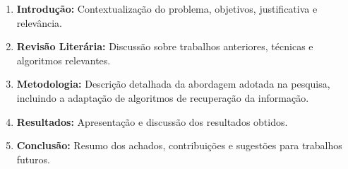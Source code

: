 \begin{enumerate}
    \item \textbf{Introdução:} Contextualização do problema, objetivos, justificativa e relevância.
    \item \textbf{Revisão Literária:} Discussão sobre trabalhos anteriores, técnicas e algoritmos relevantes.
    \item \textbf{Metodologia:} Descrição detalhada da abordagem adotada na pesquisa, incluindo a adaptação de algoritmos de recuperação da informação.
    \item \textbf{Resultados:} Apresentação e discussão dos resultados obtidos.
    \item \textbf{Conclusão:} Resumo dos achados, contribuições e sugestões para trabalhos futuros.
\end{enumerate}








